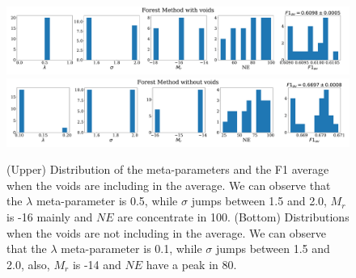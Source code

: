 \documentclass[usenatbib]{mnras}
\begin{document}
\begin{figure}
\centering
    \includegraphics[scale=0.23]{Figs/p_features_Forest_F1_av.pdf}
    \includegraphics[scale=0.23]{Figs/p_features_Forest_F1_av_no_voids.pdf}
    \caption{(Upper) Distribution of the meta-parameters and the F1 average
      when the voids are including in the average. We can observe that
      the $\lambda$ meta-parameter is 0.5, while $\sigma$
      jumps between 1.5 and 2.0, $M_r$ is -16 mainly and $NE$ are concentrate in 100.
      (Bottom) Distributions when the voids are not including in the average. We can observe that
      the $\lambda$ meta-parameter is 0.1, while $\sigma$
      jumps between 1.5 and 2.0, also, $M_r$ is -14 and $NE$ have a peak in 80.
      } 
    \label{fig:features_void}    
\end{figure}
\end{document}
